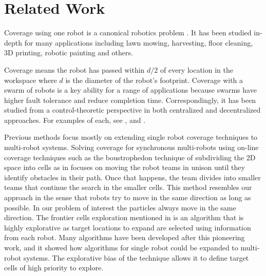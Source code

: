 
\section{Related Work}\label{sec:RelatedWork}

Coverage using one robot is a canonical robotics problem \cite{choset2001coverage}. It has been studied in-depth for many applications including lawn mowing, harvesting, floor cleaning, 3D printing, robotic painting and others. 

Coverage means the robot has passed within $d/2$ of every location in the workspace where $d$ is the diameter of the robot's footprint. Coverage with a swarm of robots is a key ability for a range of applications because swarms have higher fault tolerance and reduce completion time. Correspondingly, it has been studied from a control-theoretic perspective in  both centralized and decentralized approaches. For examples of each, see  \cite{zheng2005multi}, and \cite{wagner1999distributed}.

Previous methods focus mostly on extending single robot coverage techniques to multi-robot systems. Solving coverage for synchronous multi-robots using on-line coverage techniques such as the boustrophedon technique of subdividing the 2D space into cells as in \cite{latimer2002towards} focuses on moving the robot teams in unison until they identify obstacles in their path. 
Once that happens, the team divides into smaller teams that continue the search in the smaller cells. 
This method resembles our approach in the sense that robots try to move in the same direction as long as possible. 
In our problem of interest the particles always move in the same direction.  
The frontier cells exploration mentioned in \cite{yamauchi1998frontier} is an algorithm that is highly explorative as target locations to expand are selected using information from each robot.
 Many algorithms have been developed after this pioneering work, and it showed how algorithms for single robot could be expanded to multi-robot systems. 
 The explorative bias of the technique allows it to define target cells of high priority to explore.   

